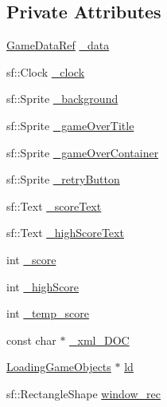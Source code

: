 \subsection*{Private Attributes}
\begin{DoxyCompactItemize}
\item 
\hyperlink{namespaceSekander_a1d69b002ba2d23020901c28f0def5e16}{Game\+Data\+Ref} \hyperlink{classSekander_1_1GameOverState_ac60174d0e0b62802ab2b0c05247d33b5}{\+\_\+data}
\item 
sf\+::\+Clock \hyperlink{classSekander_1_1GameOverState_a3b1c892e022575bd70cf97928d79b7da}{\+\_\+clock}
\item 
sf\+::\+Sprite \hyperlink{classSekander_1_1GameOverState_a250cf3a483960abc015415739067f6a5}{\+\_\+background}
\item 
sf\+::\+Sprite \hyperlink{classSekander_1_1GameOverState_a48e09487fe6fe308acbae0971d041710}{\+\_\+game\+Over\+Title}
\item 
sf\+::\+Sprite \hyperlink{classSekander_1_1GameOverState_ae699b96a7881e8852a2e64431ea5bda9}{\+\_\+game\+Over\+Container}
\item 
sf\+::\+Sprite \hyperlink{classSekander_1_1GameOverState_a1fc5e8938f774f4dc10d42b3876030ac}{\+\_\+retry\+Button}
\item 
sf\+::\+Text \hyperlink{classSekander_1_1GameOverState_adb60ef9a4d2fea746dfd3a9edf51d02b}{\+\_\+score\+Text}
\item 
sf\+::\+Text \hyperlink{classSekander_1_1GameOverState_afdd0049bf1354a13782e7ba21fb4befd}{\+\_\+high\+Score\+Text}
\item 
int \hyperlink{classSekander_1_1GameOverState_ad79b72fc4efc8b770422c2c16d07d6c3}{\+\_\+score}
\item 
int \hyperlink{classSekander_1_1GameOverState_ad7ba3fadc25c0470994d46ce91170108}{\+\_\+high\+Score}
\item 
int \hyperlink{classSekander_1_1GameOverState_ac04064783eaa87ca083beb919737635c}{\+\_\+temp\+\_\+score}
\item 
const char $\ast$ \hyperlink{classSekander_1_1GameOverState_a12cfdad7be4cb5ecc3d6678e1ed0b957}{\+\_\+xml\+\_\+\+D\+OC}
\item 
\hyperlink{classSekander_1_1LoadingGameObjects}{Loading\+Game\+Objects} $\ast$ \hyperlink{classSekander_1_1GameOverState_a5f0d39a093c067de484c17561f862de2}{ld}
\item 
sf\+::\+Rectangle\+Shape \hyperlink{classSekander_1_1GameOverState_aad418282474c59558d02e5b7f52a841c}{window\+\_\+rec}
\item 

\end{DoxyCompactItemize}
